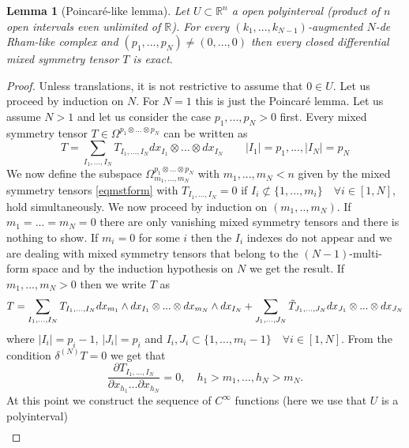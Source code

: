 \documentclass[a4paper,12pt]{article}
\newtheorem{Lemma}{Lemma}[section]
\begin{document}
\begin{Lemma}[Poincaré-like lemma]
    Let $U \subset \mathbb{R}^n$ a open polyinterval (product of $n$ open intervals even unlimited of $\mathbb{R}$). For every $(k_1,...,k_{N-1})$-augmented $N$-de Rham-like complex and $(p_1,...,p_N)\neq (0,...,0)$ then every closed differential mixed symmetry tensor $T$ is exact.
\end{Lemma}
\begin{proof}
    Unless translations, it is not restrictive to assume that $0 \in U$. Let us proceed by induction on $N$. For $N=1$ this is just the Poincaré lemma. Let us assume $N>1$ and let us consider the case $p_1,...,p_N >0$ first. 
    Every mixed symmetry tensor $T \in \Omega^{p_1 \otimes ... \otimes p_N}$ can be written as
    \begin{equation}
        T=\sum_{I_1,...,I_N}T_{I_1,...,I_N}dx_{I_1} \otimes ... \otimes dx_{I_N} \qquad |I_1|=p_1,...,|I_N|=p_N
        \label{eqmstform}
    \end{equation}
    We now define the subspace $\Omega^{p_1 \otimes ... \otimes p_N}_{m_1,...,m_N}$ with $m_1,...,m_N < n$ given by the mixed symmetry tensors \eqref{eqmstform} with $T_{I_1,...,I_N}=0$ if $I_i \not\subset \{1,...,m_i\} \quad \forall i \in [1,N]$,  hold simultaneously. We now proceed by induction on $(m_1,..,m_N)$. If $m_1=...=m_N=0$ there are only vanishing mixed symmetry tensors and there is nothing to show. If $m_i=0$ for some $i$ then the $I_i$ indexes do not appear and we are dealing with mixed symmetry tensors that belong to the $(N-1)$-multi-form space and by the induction hypothesis on $N$ we get the result. If $m_1,...,m_N >0$ then we write $T$ as
    \begin{equation}
        T=\sum_{I_1,...,I_N}T_{I_1,...,I_N} dx_{m_1} \wedge dx_{I_1}\otimes ... \otimes dx_{m_N} \wedge dx_{I_N}+\sum_{J_1,...,J_N}\Tilde{T}_{J_1,...,J_N}dx_{J_1} \otimes ... \otimes dx_{J_N}
        \label{defdiT}
    \end{equation}
    where $|I_i|=p_i-1$, $|J_i|=p_i$ and $I_i,J_i \subset \{1,...,m_i-1\} \quad \forall i \in [1,N]$. From the condition $\delta^{(N)}T=0$ we get that 
    \begin{equation}
        \frac{\partial T_{I_1,...,I_N}}{\partial x_{h_1}...\partial x_{h_N}}=0, \quad h_1>m_1,...,h_N>m_N.
    \end{equation}
    At this point we construct the sequence of $C^{\infty}$ functions (here we use that $U$ is a polyinterval)
    \begin{equation}
    \begin{aligned}

\end{aligned}
\end{equation}
\end{proof}
\end{document}
